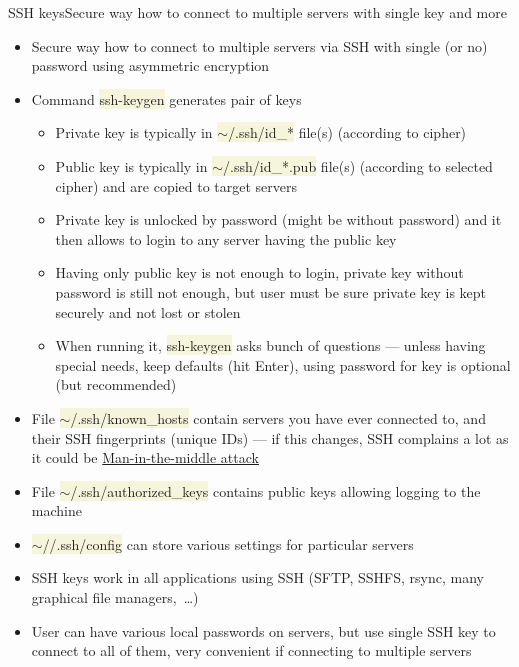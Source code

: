 \documentclass[compress, ucs, xelatex, 11pt, xcolor=svgnames, aspectratio=169,
	hyperref={
		bookmarks=true,
		unicode=true,
		colorlinks=true,
		pdftitle={Linux, command line and MetaCentrum},
		plainpages=false,
		pdfauthor={Vojtech Zeisek},
		pdfsubject={Course about use of Linux command line, writing shell scripts and using MetaCentrum of CESNET},
		pdfcreator={XeLaTeX},
		pdfkeywords={Linux, GNU, BASH, shell, command line, MetaCentrum},
		linkcolor=DarkRed, %
		anchorcolor=DarkBlue, %
		citecolor=Indigo, %
		filecolor=NavyBlue, %
		menucolor=DarkMagenta, %
		urlcolor=DarkBlue, %
		pdftex},
	url={hyphens, lowtilde} %
	]{beamer}
\renewcommand{\texttt}[1]{\colorbox{Beige}{{\ttfamily #1}}}
\begin{document}
\begin{frame}[allowframebreaks]{SSH keys}{Secure way how to connect to multiple servers with single key and more}
	\begin{itemize}
		\item Secure way how to connect to multiple servers via SSH with single (or no) password using asymmetric encryption
		\item Command \texttt{ssh-keygen} generates pair of keys
		\begin{itemize}
			\item Private key is typically in \texttt{$\sim$/.ssh/id\_*} file(s) (according to cipher)
			\item Public key is typically in \texttt{$\sim$/.ssh/id\_*.pub} file(s) (according to selected cipher) and are copied to target servers
			\item Private key is unlocked by password (might be without password) and it then allows to login to any server having the public key
			\item Having only public key is not enough to login, private key without password is still not enough, but user must be sure private key is kept securely and not lost or stolen
			\item When running it, \texttt{ssh-keygen} asks bunch of questions --- unless having special needs, keep defaults (hit Enter), using password for key is optional (but recommended)
		\end{itemize}
		\item File \texttt{$\sim$/.ssh/known\_hosts} contain servers you have ever connected to, and their SSH fingerprints (unique IDs) --- if this changes, SSH complains a lot as it could be \href{https://en.wikipedia.org/wiki/Man-in-the-middle_attack}{Man-in-the-middle attack}
		\item File \texttt{$\sim$/.ssh/authorized\_keys} contains public keys allowing logging to the machine
		\item \texttt{$\sim$//.ssh/config} can store various settings for particular servers
		\item SSH keys work in all applications using SSH (SFTP, SSHFS, rsync, many graphical file managers,~\ldots)
		\item User can have various local passwords on servers, but use single SSH key to connect to all of them, very convenient if connecting to multiple servers
	\end{itemize}
\end{frame}
\end{document}
